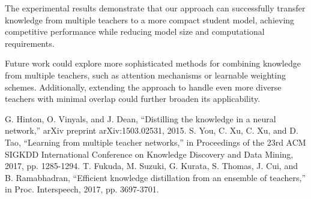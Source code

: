 \documentclass[conference]{IEEEtran}
\begin{document}
The experimental results demonstrate that our approach can successfully transfer knowledge from multiple teachers to a more compact student model, achieving competitive performance while reducing model size and computational requirements.

Future work could explore more sophisticated methods for combining knowledge from multiple teachers, such as attention mechanisms or learnable weighting schemes. Additionally, extending the approach to handle even more diverse teachers with minimal overlap could further broaden its applicability.

\begin{thebibliography}{00}
 G. Hinton, O. Vinyals, and J. Dean, ``Distilling the knowledge in a neural network,'' arXiv preprint arXiv:1503.02531, 2015.
 S. You, C. Xu, C. Xu, and D. Tao, ``Learning from multiple teacher networks,'' in Proceedings of the 23rd ACM SIGKDD International Conference on Knowledge Discovery and Data Mining, 2017, pp. 1285-1294.
 T. Fukuda, M. Suzuki, G. Kurata, S. Thomas, J. Cui, and B. Ramabhadran, ``Efficient knowledge distillation from an ensemble of teachers,'' in Proc. Interspeech, 2017, pp. 3697-3701.
\end{thebibliography}
\end{document}

